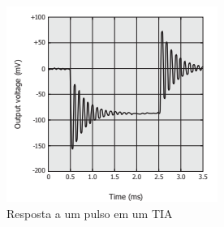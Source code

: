 \begin{figure}[htb]
	\caption{\label{figura_respostaTIA2}Resposta a um pulso em um TIA}
	\begin{center}
	    \includegraphics[scale=0.8]{Imagens/RespostaEspectralTIA2.png}
	\end{center}
\end{figure}

\clearpage